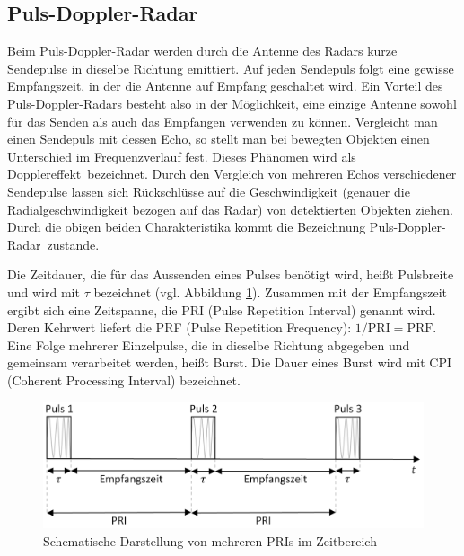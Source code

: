 
\subsection{Puls-Doppler-Radar}

Beim Puls-Doppler-Radar werden durch die Antenne des Radars kurze Sendepulse in dieselbe Richtung emittiert. Auf jeden Sendepuls folgt eine gewisse Empfangszeit, in der die Antenne auf Empfang geschaltet wird. Ein Vorteil des Puls-Doppler-Radars besteht also in der Möglichkeit, eine einzige Antenne sowohl für das Senden als auch das Empfangen verwenden zu können. Vergleicht man einen Sendepuls mit dessen Echo, so stellt man bei bewegten Objekten einen Unterschied im Frequenzverlauf fest. Dieses Phänomen wird als \glqq Dopplereffekt\grqq ~bezeichnet. Durch den Vergleich von mehreren Echos verschiedener Sendepulse lassen sich Rückschlüsse auf die Geschwindigkeit (genauer die Radialgeschwindigkeit bezogen auf das Radar) von detektierten Objekten ziehen. Durch die obigen beiden Charakteristika kommt die Bezeichnung \glqq Puls-Doppler-Radar\grqq ~zustande. 

Die Zeitdauer, die für das Aussenden eines Pulses benötigt wird, heißt Pulsbreite und wird mit \( \tau \) bezeichnet (vgl. Abbildung \ref{fig:PRI}). Zusammen mit der Empfangszeit ergibt sich eine Zeitspanne, die PRI (Pulse Repetition Interval) genannt wird. Deren Kehrwert liefert die PRF (Pulse Repetition Frequency): $ 1/\text{PRI} = \text{PRF} $. Eine Folge mehrerer Einzelpulse, die in dieselbe Richtung abgegeben und gemeinsam verarbeitet werden, heißt \glqq Burst\grqq . Die Dauer eines Burst wird mit CPI (Coherent Processing Interval) bezeichnet. 
%
\begin{figure}[h] 
  \centering
     \includegraphics[scale=0.4]{images/Pulse_Radar_PRI_Zoom240.PNG}
  \caption{Schematische Darstellung von mehreren PRIs im Zeitbereich}
  \label{fig:PRI}
\end{figure} 
%


